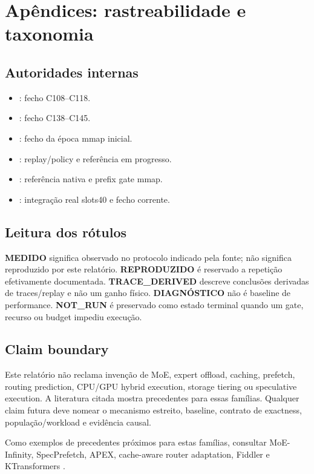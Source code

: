 \section{Apêndices: rastreabilidade e taxonomia}
\subsection*{Autoridades internas}
\begin{itemize}
\item {}: fecho C108--C118.
\item {}: fecho C138--C145.
\item {}: fecho da época mmap inicial.
\item {}: replay/policy e referência em progresso.
\item {}: referência nativa e prefix gate mmap.
\item {}: integração real slots40 e fecho corrente.
\end{itemize}

\subsection*{Leitura dos rótulos}
\textbf{MEDIDO} significa observado no protocolo indicado pela fonte; não significa reproduzido por este relatório. \textbf{REPRODUZIDO} é reservado a repetição efetivamente documentada. \textbf{TRACE\_DERIVED} descreve conclusões derivadas de traces/replay e não um ganho físico. \textbf{DIAGNÓSTICO} não é baseline de performance. \textbf{NOT\_RUN} é preservado como estado terminal quando um gate, recurso ou budget impediu execução.

\subsection*{Claim boundary}
Este relatório não reclama invenção de MoE, expert offload, caching, prefetch, routing prediction, CPU/GPU hybrid execution, storage tiering ou speculative execution. A literatura citada mostra precedentes para essas famílias. Qualquer claim futura deve nomear o mecanismo estreito, baseline, contrato de exactness, população/workload e evidência causal.

Como exemplos de precedentes próximos para estas famílias, consultar MoE-Infinity, SpecPrefetch, APEX, cache-aware router adaptation, Fiddler e KTransformers \cite{xue2024moeinfinity,kong2026specprefetch,kanani2026apex,wu2026cacheaware,kamahori2025fiddler,chen2025ktransformers}.
